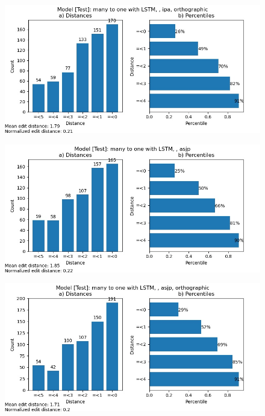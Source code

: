 \begin{figure}
    \centering
    \includegraphics[width=\textwidth]{ciobanu_many2one_test_ipa_ortho.jpg}
    \label{fig:sdtio}
\end{figure}

\begin{figure}
    \centering
    \includegraphics[width=\textwidth]{ciobanu_many2one_test_asjp.jpg}
    \label{fig:sdta}
\end{figure}

\begin{figure}
    \centering
    \includegraphics[width=\textwidth]{ciobanu_many2one_test_asjp_ortho.jpg}
    \label{fig:sdtao}
\end{figure}

